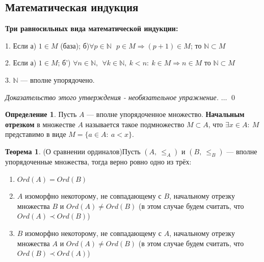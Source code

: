 \documentclass[12pt,oneside]{article}
\theoremstyle{definition}
\newtheorem{definition}{Определение}
\newtheorem{theorem}{Теорема}[section]
\newenvironment{ourproof}[1]{\textit{Доказательство #1.}}{\qed}
\begin{document}
\subsection{Математическая индукция}
\textbf{Три равносильных вида математической индукции:}

1. Если 
\newline
а) $1\in M$  (база);
\newline
б)$\forall p\in \mathbb{N}\ \ \  p\in M \Longrightarrow (p+1)\in M$; 
\newline
то $\mathbb{N}\subset M$

2. Если
\newline
а) $1\in M$;
\newline
б') $\forall n\in\mathbb{N},\ \ \forall k\in\mathbb{N},\ k<n:\ k\in M \Longrightarrow n\in M$
\newline
то $\mathbb{N}\subset M$

3. $\mathbb{N}$ --- вполне упорядочено.

\begin{ourproof}{этого утверждения - необязательное упражнение}
$\dots$
\end{ourproof}

\begin{definition}
Пусть $A$ --- вполне упорядоченное множество. \textbf{Начальным отрезком } в множестве $A$ называется такое подмножество $M\subset A$, что $\exists x\in A:\ M$ представимо в виде $M = \{a\in A:\ a < x\}$.
\end{definition}

\begin{theorem}(О сравнении ординалов)\label{sravn_ord}
Пусть $(A,\ \leqslant_A)$ и $(B,\ \leqslant_B)$ --- вполне упорядоченные множества, тогда верно ровно одно из трёх:
\begin{enumerate}
    \item $Ord(A) = Ord(B)$
    \item $A$ изоморфно некоторому, не совпадающему с $B$, начальному отрезку множества $B$ и $Ord(A)\neq Ord(B)$ (в этом случае будем считать, что $Ord(A) \prec Ord(B)$)
    \item $B$ изоморфно некоторому, не совпадающему с $A$, начальному отрезку множества $A$ и $Ord(A)\neq Ord(B)$ (в этом случае будем считать, что $Ord(B) \prec Ord(A)$)
\end{enumerate}
\end{theorem}
\end{document}
